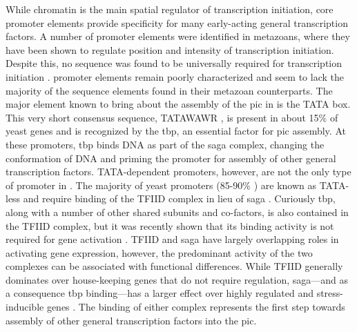 While chromatin is the main spatial regulator of transcription initiation, core promoter elements provide specificity for many early-acting general transcription factors. 
A number of promoter elements were identified in metazoans, where they have been shown to regulate position and intensity of transcription initiation.
Despite this, no sequence was found to be universally required for transcription initiation \cite{butler:2002:RNA}.
\cer{} promoter elements remain poorly characterized and seem to lack the majority of the sequence elements found in their metazoan counterparts. 
The major element known to bring about the assembly of the \gls{pic} in \cer{} is the TATA box.
This very short consensus sequence, TATAWAWR \citep{basehoar:2004:identification}, is present in about 15\% of yeast genes \cite{kamenova:2014:mutations} and is recognized by the \gls{tbp}, an essential factor for \gls{pic} assembly. 
At these promoters, \gls{tbp} binds DNA as part of the \gls{saga} complex, changing the conformation of DNA and priming the promoter for assembly of other general transcription factors. 
TATA-dependent promoters, however, are not the only type of promoter in \cer{}. 
The majority of yeast promoters (85-90\% )  are known as TATA-less and require binding of the TFIID complex in lieu of \gls{saga} \citep{rhee:2012:genomewide}. 
Curiously \gls{tbp}, along with a number of other shared subunits and co-factors, is also contained in the TFIID complex, but it was recently shown that its binding activity is not required for gene activation \cite{kamenova:2014:mutations}.
TFIID and \gls{saga} have largely overlapping roles in activating gene expression, however, the predominant activity of the two complexes can be associated with functional differences.
While TFIID generally dominates over house-keeping genes that do not require regulation, \gls{saga}---and as a consequence \gls{tbp} binding---has a larger effect over highly regulated and stress-inducible genes \citep{huisinga:2004:genomewide}.
The binding of either complex represents the first step towards assembly of other general transcription factors into the \gls{pic}.


